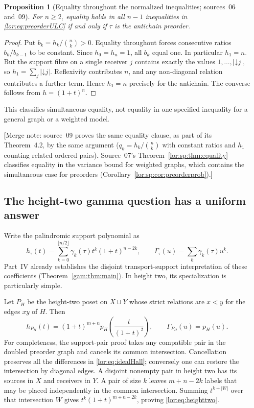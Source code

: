 \documentclass[11pt]{article}
\numberwithin{equation}{section}
\newtheorem{proposition}[theorem]{Proposition}
\theoremstyle{definition}
\newcommand{\down}{\mathord\downarrow}
\begin{document}
\begin{proposition}[Equality throughout the normalized inequalities; sources~06 and~09]
For $n\ge2$, equality holds in all $n-1$ inequalities in
\eqref{lor:eq:preorderULC} if and only if $\tau$ is the antichain preorder.
\end{proposition}
\begin{proof}
Put $b_k=h_k/\binom n k>0$. Equality throughout forces consecutive ratios
$b_k/b_{k-1}$ to be constant. Since $h_0=h_n=1$, all $b_k$ equal one.
In particular $h_1=n$. But the support fibre on a single receiver $j$
contains exactly the values $1,\ldots,|\down j|$, so
$h_1=\sum_j|\down j|$. Reflexivity contributes $n$, and any non-diagonal
relation contributes a further term. Hence $h_1=n$ precisely for the
antichain. The converse follows from $h=(1+t)^n$.
\end{proof}
This classifies simultaneous equality, not equality in one specified
inequality for a general graph or a weighted model.

[Merge note: source~09 proves the same equality clause, as part of its
Theorem~4.2, by the same argument ($q_k=h_k/\binom nk$ with constant ratios
and $h_1$ counting related ordered pairs). Source~07's
Theorem~\ref{lor:sp:thm:equality} classifies equality in the variance bound
for weighted graphs, which contains the simultaneous case for preorders
(Corollary~\ref{lor:sp:cor:preorderprob}).]

\subsection{The height-two gamma question has a uniform answer}
Write the palindromic support polynomial as
\begin{equation}
 h_\tau(t)=\sum_{k=0}^{\lfloor n/2\rfloor}
               \gamma_k(\tau)t^k(1+t)^{n-2k},
 \qquad \Gamma_\tau(u)=\sum_k\gamma_k(\tau)u^k.
 \label{lor:eq:gamma}
\end{equation}
Part~IV already establishes the disjoint transport-support
interpretation of these coefficients (Theorem~\ref{gam:thm:main}). In height two,
its specialization is particularly simple.

Let $P_H$ be the height-two poset on $X\sqcup Y$ whose strict relations are
$x<y$ for the edges $xy$ of $H$. Then
\begin{equation}
 h_{P_H}(t)=(1+t)^{m+n}
        p_H\!\left(\frac{t}{(1+t)^2}\right),
 \qquad \Gamma_{P_H}(u)=p_H(u).
 \label{lor:eq:heighttwo}
\end{equation}
For completeness, the support-pair proof takes any compatible pair in the
doubled preorder graph and cancels its common intersection. Cancellation
preserves all the differences in \eqref{lor:eq:idealHall}; conversely one can
restore the intersection by diagonal edges. A disjoint nonempty pair in
height two has its sources in $X$ and receivers in $Y$. A pair of size $k$
leaves $m+n-2k$ labels that may be placed independently in the common
intersection. Summing $t^{k+|W|}$ over that intersection $W$ gives
$t^k(1+t)^{m+n-2k}$, proving \eqref{lor:eq:heighttwo}.
\end{document}
